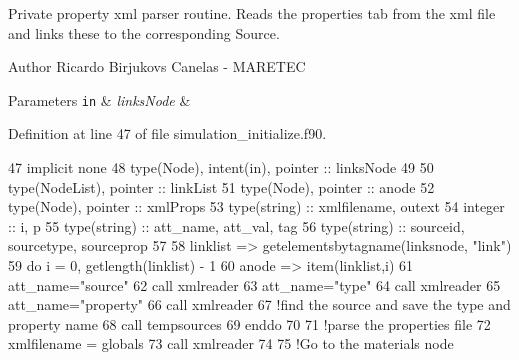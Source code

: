 Private property xml parser routine. Reads the properties tab from the xml file and links these to the corresponding Source. 

\begin{DoxyAuthor}{Author}
Ricardo Birjukovs Canelas -\/ M\+A\+R\+E\+T\+EC 
\end{DoxyAuthor}

\begin{DoxyParams}[1]{Parameters}
\mbox{\tt in}  & {\em links\+Node} & \\
\hline
\end{DoxyParams}


Definition at line 47 of file simulation\+\_\+initialize.\+f90.


\begin{DoxyCode}
47     \textcolor{keywordtype}{implicit none}
48     \textcolor{keywordtype}{type}(Node), \textcolor{keywordtype}{intent(in)}, \textcolor{keywordtype}{pointer} :: linksNode
49 
50     \textcolor{keywordtype}{type}(NodeList), \textcolor{keywordtype}{pointer} :: linkList
51     \textcolor{keywordtype}{type}(Node), \textcolor{keywordtype}{pointer} :: anode
52     \textcolor{keywordtype}{type}(Node), \textcolor{keywordtype}{pointer} :: xmlProps
53     \textcolor{keywordtype}{type}(string) :: xmlfilename, outext
54     \textcolor{keywordtype}{integer} :: i, p
55     \textcolor{keywordtype}{type}(string) :: att\_name, att\_val, tag
56     \textcolor{keywordtype}{type}(string) :: sourceid, sourcetype, sourceprop
57 
58     linklist => getelementsbytagname(linksnode, \textcolor{stringliteral}{"link"})
59     \textcolor{keywordflow}{do} i = 0, getlength(linklist) - 1
60         anode => item(linklist,i)
61         att\_name=\textcolor{stringliteral}{"source"}
62         \textcolor{keyword}{call }xmlreader%
63         att\_name=\textcolor{stringliteral}{"type"}
64         \textcolor{keyword}{call }xmlreader%
65         att\_name=\textcolor{stringliteral}{"property"}
66         \textcolor{keyword}{call }xmlreader%
67         \textcolor{comment}{!find the source and save the type and property name}
68         \textcolor{keyword}{call }tempsources%
69 \textcolor{keywordflow}{    enddo}
70 
71     \textcolor{comment}{!parse the properties file}
72     xmlfilename = globals%
73     \textcolor{keyword}{call }xmlreader%
74 
75     \textcolor{comment}{!Go to the materials node}

\end{DoxyCode}

